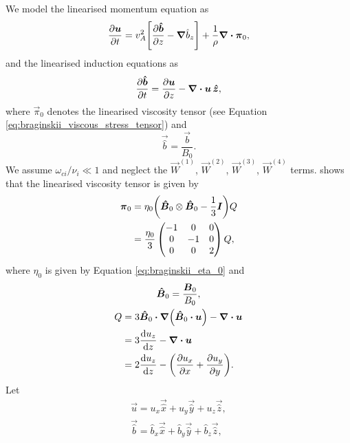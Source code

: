 We model the linearised momentum equation as
\begin{equation}
    \pdv{\boldsymbol{u}}{t}=v_A^2\qty[\pdv{\boldsymbol{\hat{b}}}{z}-\grad \hat{b}_z] + \frac{1}{\rho}\div{\boldsymbol{\pi}_0},
\end{equation}
and the linearised induction equations as
\begin{equation}
    \pdv{\boldsymbol{\hat{b}}}{t}=\pdv{\boldsymbol{u}}{z} - \div{\boldsymbol{u}}\,\boldsymbol{\hat{z}},
\end{equation}
where $\vec{\pi}_0$ denotes the linearised viscosity tensor (see Equation \ref{eq:braginskii_viscous_stress_tensor}) and
\begin{equation}
    \vec{\hat{b}} = \frac{\vec{b}}{B_0}.
\end{equation}
We assume $\omega_{ci}/\nu_i\ll1$ and neglect the $\vec{W}^{(1)}$, $\vec{W}^{(2)}$, $\vec{W}^{(3)}$, $\vec{W}^{(4)}$ terms. \citet{Mocanu2008} shows that the linearised viscosity tensor is given by
\begin{equation}
\begin{aligned}
    \boldsymbol{\pi}_0 &= \eta_0\qty(\boldsymbol{\hat{B}}_0 \otimes \boldsymbol{\hat{B}}_0 - \frac{1}{3}\boldsymbol{I})Q \\
    &=\frac{\eta_0}{3}\begin{pmatrix}
    -1 & 0  & 0 \\
    0  & -1 & 0 \\
    0  & 0  & 2  \\
    \end{pmatrix} Q,
\end{aligned} 
\end{equation}
where $\eta_0$ is given by Equation \eqref{eq:braginskii_eta_0} and 
\begin{gather}
    \vec{\hat{B}}_0 = \frac{\vec{B}_0}{B_0}, \\
    \begin{aligned}
    Q &= 3\vec{\hat{B}}_0\vdot\grad(\vec{\hat{B}}_0\vdot\vec{u}) - \div{\vec{u}} \\
    &= 3\dv{u_z}{z} - \div{\vec{u}} \\
    & = 2\dv{u_z}{z} - \qty(\pdv{u_x}{x} + \pdv{u_y}{y}).
    \end{aligned}
\end{gather}
Let
\begin{gather}
    \vec{u} = u_x \vec{\hat{x}} + u_y \vec{\hat{y}} + u_z \vec{\hat{z}}, \\
    \vec{\hat{b}} = \hat{b}_x \vec{\hat{x}} + \hat{b}_y \vec{\hat{y}} + \hat{b}_z \vec{\hat{z}},
\end{gather}
